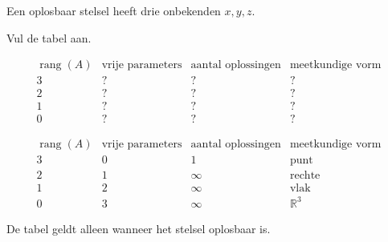 \documentclass{ximera}
\begin{document}
\begin{oefening}{\oefU\ESS}

Een oplosbaar stelsel heeft drie onbekenden \(x,y,z\).

Vul de tabel aan.

\[
\begin{array}{c|c|c|c}
\operatorname{rang}(A)
&
\text{vrije parameters}
&
\text{aantal oplossingen}
&
\text{meetkundige vorm}
\\
\hline
3 & ? & ? & ?\\
2 & ? & ? & ?\\
1 & ? & ? & ?\\
0 & ? & ? & ?
\end{array}
\]

\begin{oplossing}

\[
\begin{array}{c|c|c|c}
\operatorname{rang}(A)
&
\text{vrije parameters}
&
\text{aantal oplossingen}
&
\text{meetkundige vorm}
\\
\hline
3&0&1&\text{punt}\\
2&1&\infty&\text{rechte}\\
1&2&\infty&\text{vlak}\\
0&3&\infty&\mathbb{R}^{3}
\end{array}
\]

De tabel geldt alleen wanneer het stelsel oplosbaar is.

\end{oplossing}

\end{oefening}



\end{document}
